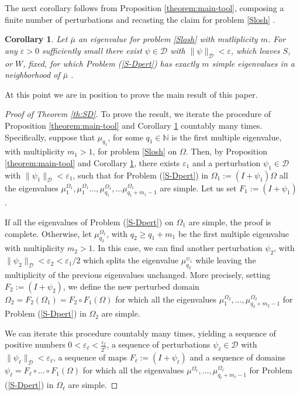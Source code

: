 \documentclass[a4paper,reqno,11pt,oneside]{amsart}
\theoremstyle{plain}
\theoremstyle{plain}
\theoremstyle{plain}
\newtheorem{corollary}[thm]{Corollary}
\theoremstyle{remark}
\begin{document}
The next corollary follows from Proposition \ref{theorem:main-tool}, composing
a finite number of perturbations and recasting the claim for problem \eqref{Slosh} .
\begin{corollary}\label{cor:auto-semplice-0}
Let $\bar\mu$ an eigenvalue for problem \eqref{Slosh} with mutliplicity $m$.  For any $\varepsilon>0$ sufficiently small there exist $\psi \in \mathcal{D}$  with $\|\psi\|_\mathcal{D}<\varepsilon$, which leaves $S$, or  $W$, fixed, for which  Problem (\ref{S-Dpert})  has exactly $m$ simple eigenvalues in a neighborhood of $\bar\mu$ .

\end{corollary}
At this point we are in position to prove the main result of this paper.
\begin{proof}[Proof of Theorem  \ref{th:SD}]
To prove the result, we iterate the procedure of Proposition \ref{theorem:main-tool} and Corollary \ref{cor:auto-semplice-0} countably many times.  
Specifically, suppose that  $ \mu_{q_1}$, for some $q_1\in \mathbb{N}$ is the first multiple eigenvalue, with multiplicity $m_1>1$, for problem \eqref{Slosh} on $\Omega$. Then, by Proposition  \ref{theorem:main-tool} and Corollary  \ref{cor:auto-semplice-0}, there exists $\varepsilon_1$ and a perturbation $\psi_1\in\mathcal{D}$ with  $\|\psi_1\|_\mathcal{D}<\varepsilon_1$, such that for Problem (\ref{S-Dpert}) in $\Omega_{1}:=(I+\psi_1)\Omega$ all the eigenvalues $\mu^{\Omega_1}_1, \mu^{\Omega_1}_1\dots,\mu^{\Omega_1}_{q_1},\dots \mu^{\Omega_1}_{{q_1}+m_1-1}$ are simple. Let us set $F_1:=(I+\psi_1)$. 

If all the eigenvalues of Problem (\ref{S-Dpert}) on $\Omega_1$ are simple, the proof is complete. Otherwise, let $ \mu^{\Omega_1}_{q_2}$, with $q_2\ge q_1+m_1$ be the first multiple eigenvalue with multiplicity $m_2>1$.  In this case, we can find another perturbation $\psi_2$, with $\|\psi_2\|_\mathcal{D}<\varepsilon_2< \varepsilon_1/2$ which splits the eigenvalue  $ \mu^{\psi_1}_{q_2}$ while leaving the multiplicity of the previous eigenvalues unchanged. More precisely, setting $F_2:=(I+\psi_2)$, we define the new perturbed domain $\Omega_2=F_2(\Omega_1)=F_2\circ F_1 (\Omega)$ for which all the eigenvalues $\mu^{\Omega_2}_1,\dots, \mu^{\Omega_2}_{{q_2}+m_2-1}$  for Problem (\ref{S-Dpert}) in $\Omega_2$ are simple. 

We can iterate this procedure countably many times, yielding a sequence of positive numbers $0<\varepsilon_\ell<    \frac{\varepsilon_\ell}{2^\ell}$, a sequence of perturbations $\psi_\ell\in \mathcal{D}$ with $\|\psi_\ell\|_\mathcal{D}<\varepsilon_\ell$, a sequence of maps $F_\ell:=(I+\psi_\ell)$ and a sequence of domains $\psi_\ell=F_\ell\circ\dots\circ F_1(\Omega)$ for  which all the eigenvalues $\mu^{\Omega_\ell},\dots,\mu^{\Omega_\ell}_{q_\ell+m_\ell-1}$  for Problem (\ref{S-Dpert}) in $\Omega_\ell$ are simple. 


\end{proof}
\end{document}
